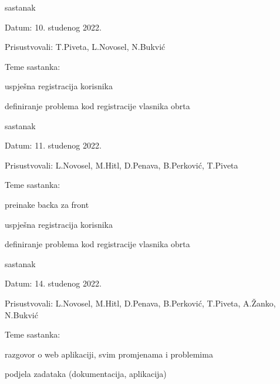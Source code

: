 \begin{packed_enum}
			\item  sastanak
			\item[] \begin{packed_item}
				\item Datum: 10. studenog 2022.
				\item Prisustvovali: T.Piveta, L.Novosel, N.Bukvić
				\item Teme sastanka:
				\begin{packed_item}
				    \item  uspješna registracija korisnika
				    \item  definiranje problema kod registracije vlasnika obrta
				\end{packed_item}
			\end{packed_item}
			
			\item  sastanak
			\item[] \begin{packed_item}
				\item Datum: 11. studenog 2022.
				\item Prisustvovali: L.Novosel, M.Hitl, D.Penava, B.Perković, T.Piveta
				\item Teme sastanka:
				\begin{packed_item}
				    \item preinake backa za front
				    \item  uspješna registracija korisnika
				    \item  definiranje problema kod registracije vlasnika obrta
				\end{packed_item}
			\end{packed_item}

            \item  sastanak
    			\item[] \begin{packed_item}
    				\item Datum: 14. studenog 2022.
    				\item Prisustvovali: L.Novosel, M.Hitl, D.Penava, B.Perković, T.Piveta, A.Žanko, N.Bukvić
    				\item Teme sastanka:
    				\begin{packed_item}
    				    \item  razgovor o web aplikaciji, svim promjenama i problemima
    				    \item  podjela zadataka (dokumentacija, aplikacija)
    				\end{packed_item}
    			\end{packed_item}


\end{packed_enum}
